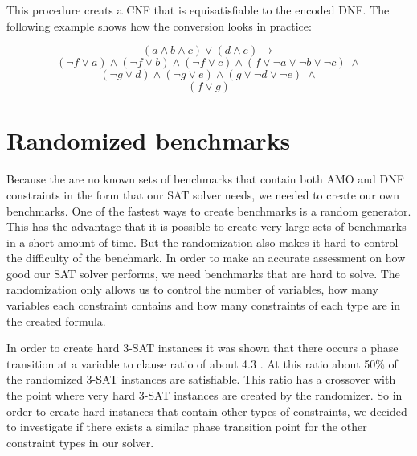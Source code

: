 This procedure creats a CNF that is equisatisfiable to the encoded DNF. The following example shows how the conversion looks in practice:

\begin{leftbar}
\begin{displaymath}
(a \wedge b \wedge c) \vee (d \wedge e) \rightarrow
\end{displaymath}
\begin{displaymath}
(\neg f \vee a) \wedge (\neg f \vee b) \wedge (\neg f \vee c) \wedge (f \vee \neg a \vee \neg b \vee \neg c)\; \wedge
\end{displaymath}
\begin{displaymath}
(\neg g \vee d) \wedge (\neg g \vee e) \wedge (g \vee \neg d \vee \neg e) \; \wedge
\end{displaymath}
\begin{displaymath}
(f \vee g)
\end{displaymath}
\end{leftbar}

\section{Randomized benchmarks}

Because the are no known sets of benchmarks that contain both AMO and DNF constraints in the form that our SAT solver needs, we needed to create our own benchmarks. One of the fastest ways to create benchmarks is a random generator. This has the advantage that it is possible to create very large sets of benchmarks in a short amount of time. But the randomization also makes it hard to control the difficulty of the benchmark. In order to make an accurate assessment on how good our SAT solver performs, we need benchmarks that are hard to solve. The randomization only allows us to control the number of variables, how many variables each constraint contains and how many constraints of each type are in the created formula.

In order to create hard 3-SAT instances it was shown that there occurs a phase transition at a variable to clause ratio of about 4.3 \cite{gent1994sat}. At this ratio about 50\% of the randomized 3-SAT instances are satisfiable. This ratio has a crossover with the point where very hard 3-SAT instances are created by the randomizer. So in order to create hard instances that contain other types of constraints, we decided to investigate if there exists a similar phase transition point for the other constraint types in our solver.

